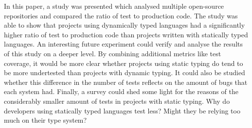 \documentclass[conference]{IEEEtran}
\begin{document}
In this paper, a study was presented which analysed multiple open-source repositories and compared the ratio of test to production code. The study was able to show that projects using dynamically typed languages had a significantly higher ratio of test to production code than projects written with statically typed languages. An interesting future experiment could verify and analyse the results of this study on a deeper level. By combining additional metrics like test coverage, it would be more clear whether projects using static typing do tend to be more undertested than projects with dynamic typing. It could also be studied whether this difference in the number of tests reflects on the amount of bugs that each system had. Finally, a survey could shed some light for the reasons of the considerably smaller amount of tests in projects with static typing. Why do developers using statically typed languages test less? Might they be relying too much on their type system?



\end{document}
